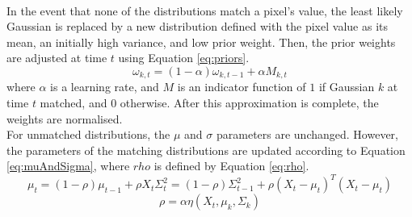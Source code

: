 \smallskip \\ \indent
In the event that none of the distributions match a pixel's value, the least likely Gaussian is replaced by a new distribution defined with the pixel value as its mean, an initially high variance, and low prior weight. Then, the prior weights are adjusted at time $t$ using Equation \ref{eq:priors}.
\begin{equation}
    \label{eq:priors}
    \omega_{k,t} = (1-\alpha)\omega_{k,t-1} + \alpha M_{k,t}
\end{equation}
where $\alpha$ is a learning rate, and $M$ is an indicator function of $1$ if Gaussian $k$ at time $t$ matched, and $0$ otherwise. After this approximation is complete, the weights are normalised.
\smallskip \\ \indent
For unmatched distributions, the $\mu$ and $\sigma$ parameters are unchanged. However, the parameters of the matching distributions are updated according to Equation \ref{eq:muAndSigma}, where $rho$ is defined by Equation \ref{eq:rho}.
\begin{subequations}
    \label{eq:muAndSigma}
    \begin{equation}
        \mu_t = (1 - \rho) \mu_{t-1} + \rho X_t
    \end{equation}
    \begin{equation}
        \Sigma^2_t = (1 - \rho) \Sigma^2_{t-1} + \rho(X_t - \mu_t)^T(X_t - \mu_t)
    \end{equation}
\end{subequations}
\begin{equation}
    \label{eq:rho}
    \rho = \alpha \eta(X_t, \mu_k, \Sigma_k)
\end{equation}

\setlength{\leftskip}{0cm}
